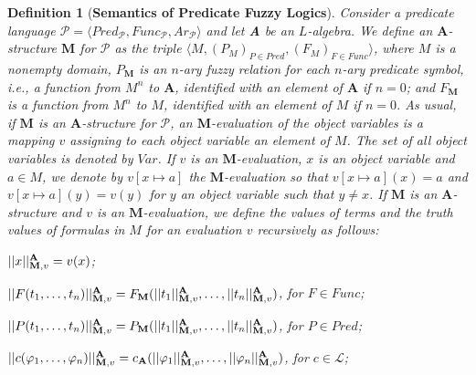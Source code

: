 \documentclass{IOS-Book-Article}
\newtheorem{defi}{Definition}
\begin{document}
\begin{defi} [\textbf{Semantics of Predicate Fuzzy Logics}] \label{evaluation} Consider a predicate language $\mathcal{P}=\langle Pred_{\mathcal{P}}, Func_{\mathcal{P}}, Ar_{\mathcal{P}} \rangle$ and let \textbf{A} be an $L$-algebra. We define an $\textbf{A}$\emph{-structure} $\mathrm{\mathbf{M}}$ for $\mathcal{P}$ as the triple $\langle M, (P_M)_{P\in Pred}, (F_M)_{F\in Func} \rangle$, where $M$ is a nonempty domain, $P_{\mathrm{\mathbf{M}}}$ is an $n$-ary fuzzy relation for each $n$-ary predicate symbol, i.e., a function from $M^n$ to $\textbf{A}$, identified with an element of $\textbf{A}$ if $n=0$; and $F_{\mathrm{\mathbf{M}}}$ is a function from $M^n$ to $M$, identified with an element of $M$ if $n=0$. As usual, if $\mathrm{\mathbf{M}}$ is an $\textbf{A}$-structure for $\mathcal{P}$, an $\mathrm{\mathbf{M}}$-evaluation of the object variables is a mapping $v$ assigning to each object variable an element of $M$. The set of all object variables is denoted by $Var$. If $v$ is an $\mathrm{\mathbf{M}}$-evaluation, $x$ is an object variable and $a\in M$, we denote by $v[x\mapsto a]$ the $\mathrm{\mathbf{M}}$-evaluation so that $v[x\mapsto a](x)=a$ and $v[x\mapsto a](y)=v(y)$ for $y$ an object variable such that $y\not=x$. If $\mathrm{\mathbf{M}}$ is an $\textbf{A}$-structure and $v$ is an $\mathrm{\mathbf{M}}$-evaluation, we define the \emph{values} of terms and the \emph{truth values} of formulas in $M$ for an evaluation $v$ recursively as follows:
 
\begin{description}

\item $||x||^{\small{\textbf{A}}}_{\mathrm{\mathbf{M}},v}=v(x)$;

\item $||F(t_1,\ldots,t_n)||^{\small{\textbf{A}}}_{\mathrm{\mathbf{M}},v}=F_{\mathrm{\mathbf{M}}}(||t_1||^{\small{\textbf{A}}}_{\mathrm{\mathbf{M}},v},\ldots,||t_n||^{\small{\textbf{A}}}_{\mathrm{\mathbf{M}},v})$, for $F\in Func$;

\item $||P(t_1,\ldots,t_n)||^{\small{\textbf{A}}}_{\mathrm{\mathbf{M}},v}=P_{\mathrm{\mathbf{M}}}(||t_1||^{\small{\textbf{A}}}_{\mathrm{\mathbf{M}},v},\ldots,||t_n||^{\small{\textbf{A}}}_{\mathrm{\mathbf{M}},v})$, for $P\in Pred$;

\item $||c(\varphi_1,\ldots,\varphi_n)||^{\small{\textbf{A}}}_{\mathrm{\mathbf{M}},v}=c_{\textbf{A}}(||\varphi_1||^{\small{\textbf{A}}}_{\mathrm{\mathbf{M}},v},\ldots,||\varphi_n||^{\small{\textbf{A}}}_{\mathrm{\mathbf{M}},v})$, for $c\in\mathcal{L}$;


\end{description}
\end{defi}
\end{document}
